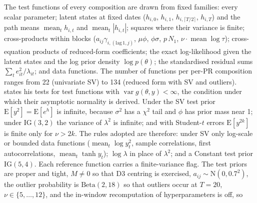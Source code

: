 The test functions of every composition are drawn from fixed families: every scalar parameter;
latent states at fixed dates ($h_{i,0}$, $h_{i,1}$, $h_{i,\lceil T/2\rceil}$, $h_{i,T}$) and the path
means $\operatorname{mean}_t h_{i,t}$ and $\operatorname{mean}_t |h_{i,t}|$; squares where their
variance is finite; cross-products within blocks
($a_{ij}\gamma_{i,(\mathrm{lag}\,1, j)}$, $\mu\phi$, $\phi\sigma$, $p\,N_1$, $\nu\cdot\operatorname{mean}
\log\tau$); cross-equation products of reduced-form coefficients; the exact log-likelihood given the
latent states and the log prior density $\log p(\theta)$; the standardised residual sums $\sum_t
e_{it}^2/\lambda_{it}$; and data functions.
The number of functions per per-PR composition ranges from 22 (univariate SV) to 134 (reduced form
with SV and outliers).
\citet{geweke2004getting} states his tests for test functions with $\operatorname{var}g(\theta, y) <
\infty$, the condition under which their asymptotic normality is derived.
Under the SV test prior $\mathrm{E}[y^2] = \mathrm{E}[e^h]$ is infinite, because $\sigma^2$ has a
$\chi^2$ tail and $\phi$ has prior mass near 1; under $\mathrm{IG}(3, 2)$ the variance of
$\lambda^2$ is infinite; and with Student-$t$ errors $\mathrm{E}[y^{2k}]$ is finite only for $\nu >
2k$.
The rules adopted are therefore: under SV only log-scale or bounded data functions
($\operatorname{mean}_t\log y_t^2$, sample correlations, first autocorrelations,
$\operatorname{mean}_t\tanh y_t$); $\log\lambda$ in place of $\lambda^2$; and a Constant test prior
$\mathrm{IG}(5, 4)$.
Each reference function carries a finite-variance flag.
The test priors are proper and tight, $M \ne 0$ so that D3 centring is exercised, $a_{ij} \sim
\mathrm{N}(0, 0.7^2)$, the outlier probability is $\mathrm{Beta}(2, 18)$ so that outliers occur at
$T = 20$, $\nu \in \{5, \dots, 12\}$, and the in-window recomputation of hyperparameters is off, so
